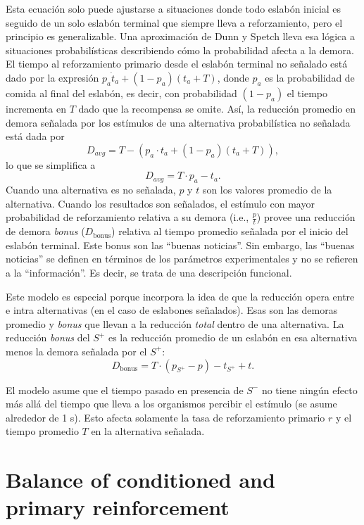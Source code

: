 \documentclass[a4paper,12pt]{article}
\begin{document}
Esta ecuación solo puede ajustarse a situaciones donde todo eslabón inicial es seguido de un solo eslabón terminal que siempre lleva a reforzamiento, pero el principio es generalizable.
Una aproximación de Dunn y Spetch lleva esa lógica a situaciones probabilísticas describiendo cómo la probabilidad afecta a la demora.
El tiempo al reforzamiento primario desde el eslabón terminal no señalado está dado por la expresión $p_{a} \dot t_{a} + (1 - p_{a})(t_{a} + T)$, donde $p_{a}$ es la probabilidad de comida al final del eslabón, es decir, con probabilidad $(1 - p_{a})$ el tiempo incrementa en $T$ dado que la recompensa se omite.
Así, la reducción promedio en demora señalada por los estímulos de una alternativa probabilística no señalada está dada por
\[
    D_{avg} = T - (p_{a} \cdot t_{a} + (1 - p_{a})(t_{a} + T))
,\]
lo que se simplifica a
\[
    D_{avg} = T \cdot p_{a} - t_{a}
.\]
Cuando una alternativa es no señalada, $p$ y $t$ son los valores promedio de la alternativa.
Cuando los resultados son señalados, el estímulo con mayor probabilidad de reforzamiento relativa a su demora (i.e., $\frac{p}{t}$) provee una reducción de demora {\itshape bonus} ($D_{\mbox{bonus}}$) relativa al tiempo promedio señalada por el inicio del eslabón terminal.
Este bonus son las ``buenas noticias''.
Sin embargo, las ``buenas noticias'' se definen en términos de los parámetros experimentales y no se refieren a la ``información''.
Es decir, se trata de una descripción funcional.

Este modelo es especial porque incorpora la idea de que la reducción opera entre e intra alternativas (en el caso de eslabones señalados).
Esas son las demoras promedio y {\itshape bonus} que llevan a la reducción {\itshape total} dentro de una alternativa.
La reducción {\itshape bonus} del $S^{+}$ es la reducción promedio de un eslabón en esa alternativa menos la demora señalada por el $S^{+}$:
\[
    D_{\mbox{bonus}} = T \cdot (p_{S^{+}} - p) - t_{S^{+}} + t
.\]

El modelo asume que el tiempo pasado en presencia de $S^{-}$ no tiene ningún efecto más allá del tiempo que lleva a los organismos percibir el estímulo (se asume alrededor de 1 s).
Esto afecta solamente la tasa de reforzamiento primario $r$ y el tiempo promedio $T$ en la alternativa señalada.

\section{Balance of conditioned and primary reinforcement}
\end{document}
